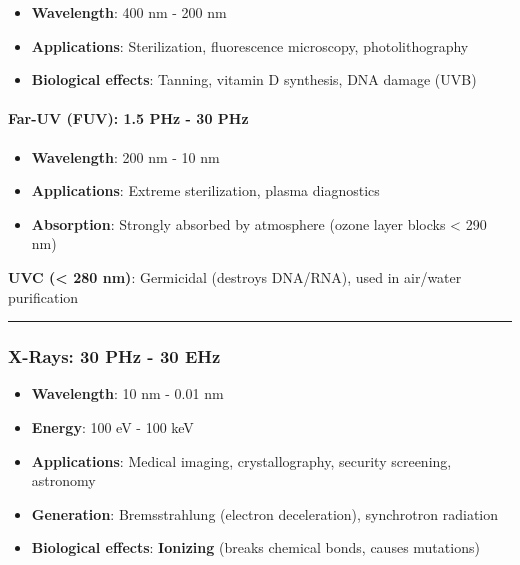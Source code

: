 \begin{itemize}
\tightlist
\item
  \textbf{Wavelength}: 400 nm - 200 nm
\item
  \textbf{Applications}: Sterilization, fluorescence microscopy,
  photolithography
\item
  \textbf{Biological effects}: Tanning, vitamin D synthesis, DNA damage
  (UVB)
\end{itemize}

\paragraph{\texorpdfstring{\textbf{Far-UV (FUV): 1.5 PHz - 30
PHz}}{Far-UV (FUV): 1.5 PHz - 30 PHz}}\label{far-uv-fuv-1.5-phz---30-phz}

\begin{itemize}
\tightlist
\item
  \textbf{Wavelength}: 200 nm - 10 nm
\item
  \textbf{Applications}: Extreme sterilization, plasma diagnostics
\item
  \textbf{Absorption}: Strongly absorbed by atmosphere (ozone layer
  blocks \textless{} 290 nm)
\end{itemize}

\textbf{UVC (\textless{} 280 nm)}: Germicidal (destroys DNA/RNA), used
in air/water purification

\begin{center}\rule{0.5\linewidth}{0.5pt}\end{center}

\subsubsection{X-Rays: 30 PHz - 30 EHz}\label{x-rays-30-phz---30-ehz}

\begin{itemize}
\tightlist
\item
  \textbf{Wavelength}: 10 nm - 0.01 nm
\item
  \textbf{Energy}: 100 eV - 100 keV
\item
  \textbf{Applications}: Medical imaging, crystallography, security
  screening, astronomy
\item
  \textbf{Generation}: Bremsstrahlung (electron deceleration),
  synchrotron radiation
\item
  \textbf{Biological effects}: \textbf{Ionizing} (breaks chemical bonds,
  causes mutations)
\end{itemize}

